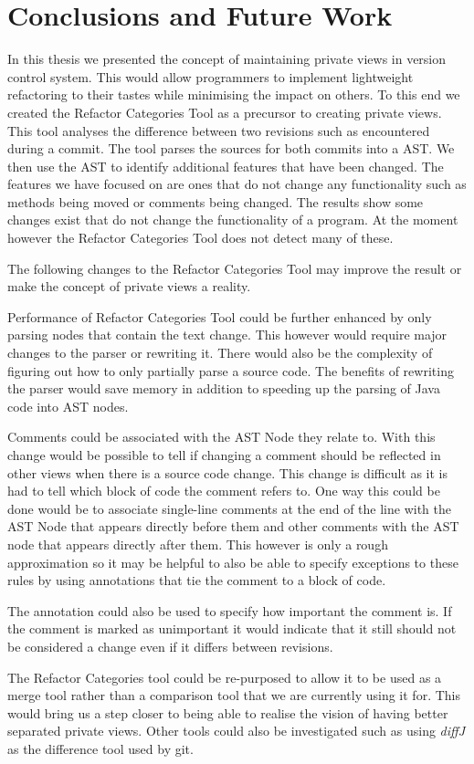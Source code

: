 
\chapter{Conclusions and Future Work}\label{C:con}

In this thesis we presented the concept of maintaining private views in version control system. 
This would allow programmers to implement lightweight refactoring to their tastes while minimising the impact on others.  
To this end we created the Refactor Categories Tool as a precursor to creating private views. 
This tool analyses the difference between two revisions such as encountered during a commit.  
The tool parses the sources for both commits into a AST. 
We then use the AST to identify additional features that have been changed. 
The features we have focused on are ones that do not change any functionality such as methods being moved or comments being changed. 
The results show some changes exist that do not change the functionality of a program.
At the moment however the Refactor Categories Tool does not detect many of these.  

The following changes to the Refactor Categories Tool may improve the result or make the concept of private views a reality.

Performance of Refactor Categories Tool could be further enhanced by only parsing nodes that contain the text change.  This however would require major changes to the parser or rewriting it. There would also be the complexity of figuring out how to only partially parse a source code. The benefits of rewriting the parser would save memory in addition to speeding up the parsing of Java code into AST nodes.


Comments could be associated with the AST Node they relate to.  With this change would be possible to tell if changing a comment should be reflected in other views when there is a source code change. This change is difficult as it is had to tell which block of code the comment refers to.  One way this could be done would be to associate single-line comments at the end of the line with the AST Node that appears directly before them and other comments with the AST node that appears directly after them.  This however is only a rough approximation so it may be helpful to also be able to specify exceptions to these rules by using annotations that tie the comment to a block of code.

The annotation could also be used to specify how important the comment is. If the comment is marked as unimportant it would indicate that it still should not be considered a change even if it differs between revisions.

The Refactor Categories tool could be re-purposed to allow it to be used as a merge tool rather than a comparison tool that we are currently using it for.  This would bring us a step closer to being able to realise the vision of having better separated private views.  Other tools could also be investigated such as using \emph{diffJ} as the difference tool used by git.
% 
% 
% 
% 
% 
